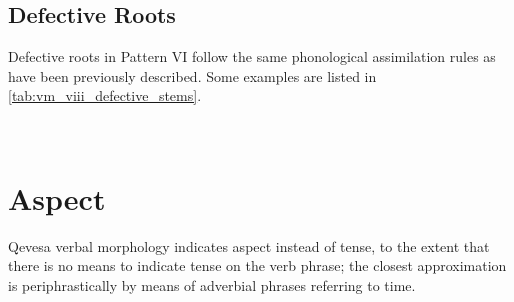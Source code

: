 \documentclass[grammar]{subfiles}
\begin{document}
\subsection{Defective Roots}
\label{ssec:vm_viii_defective_roots}

Defective roots in Pattern VI follow the same phonological assimilation rules
as have been previously described.  Some examples are listed in
\cref{tab:vm_viii_defective_stems}. 


\begin{table}[h!]\small\capstart
  \centering
  \\
  \caption{Pattern VIII defective stems \label{tab:vm_viii_defective_stems}}
\end{table}


\newpage
\section{Aspect}
\label{sec:vm_aspect}

Qevesa verbal morphology indicates aspect instead of tense, to the extent that
there is no means to indicate tense on the verb phrase; the closest
approximation is periphrastically by means of adverbial phrases referring to
time. 
\end{document}
